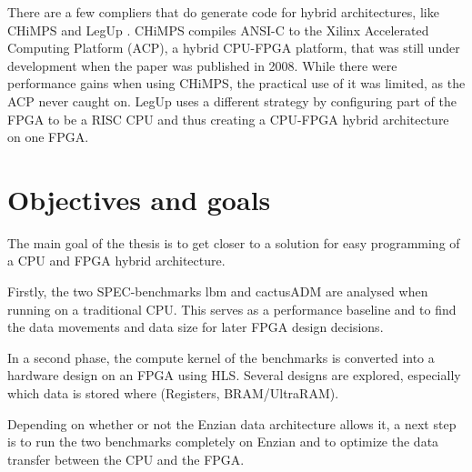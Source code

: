 \documentclass[12pt]{article}
\begin{document}
There are a few compliers that do generate code for hybrid architectures, like CHiMPS \cite{CHiMPS} and LegUp \cite{LegUp}. CHiMPS compiles ANSI-C to the Xilinx Accelerated Computing Platform (ACP), a hybrid CPU-FPGA platform, that was still under development when the paper was published in 2008. While there were performance gains when using CHiMPS, the practical use of it was limited, as the ACP never caught on. LegUp uses a different strategy by configuring part of the FPGA to be a RISC CPU and thus creating a CPU-FPGA hybrid architecture on one FPGA.
\section*{Objectives and goals}
The main goal of the thesis is to get closer to a solution for easy programming of a CPU and FPGA hybrid architecture.

Firstly, the two SPEC-benchmarks lbm \cite{SPEC_lbm} and cactusADM \cite{SPEC_cactusADM} are analysed when running on a traditional CPU. This serves as a performance baseline and to find the data movements and data size for later FPGA design decisions.

In a second phase, the compute kernel of the benchmarks is converted into a hardware design on an FPGA using HLS. Several designs are explored, especially which data is stored where (Registers, BRAM/UltraRAM).

Depending on whether or not the Enzian data architecture allows it, a next step is to run the two benchmarks completely on Enzian and to optimize the data transfer between the CPU and the FPGA.
\end{document}
